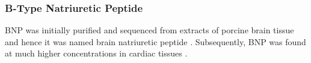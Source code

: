\documentclass[14pt,a4paper,onecolumn]{extarticle}
\begin{document}

\subsubsection{B-Type Natriuretic Peptide}
BNP was initially purified and sequenced from extracts of porcine brain tissue and hence it was named brain natriuretic peptide \citep{Sudoh1988}. Subsequently, BNP was found at much higher concentrations in cardiac tissues \citep{Mukoyama1991} \citep{Mukoyama1990}.
\end{document}
